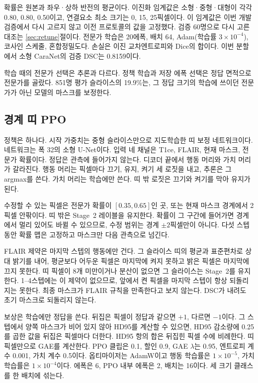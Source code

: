 \documentclass[runningheads]{llncs}
\begin{document}
확률은 원본과 좌우·상하 반전의 평균이다. 이진화 임계값은 소형·중형·대형이 각각 0.80, 0.80, 0.50이고, 연결요소 최소 크기는 0, 15, 25픽셀이다. 이 임계값은 이번 개발 검증에서 다시 고르지 않고 이전 프로토콜의 값을 고정했다. 검증 60명으로 다시 고른 대조는 \ref{sec:retune}절이다. 전문가 학습은 20에폭, 배치 64, Adam(학습률 $3\times10^{-4}$), 코사인 스케줄, 혼합정밀도다. 손실은 이진 교차엔트로피와 Dice의 합이다. 이번 분할에서 소형 CaraNet의 검증 DSC는 0.8159이다.

학습 때의 전문가 선택은 추론과 다르다. 정책 학습과 저장 에폭 선택은 정답 면적으로 전문가를 골랐다. 851명 평가 슬라이스의 19.9\%는, 그 정답 크기의 학습에 쓰이던 전문가가 아닌 모델의 마스크를 보정한다.

\subsection{경계 띠 PPO}
정책은 하나다. 시작 가중치는 중형 슬라이스만으로 지도학습한 띠 보정 네트워크이다. 네트워크는 폭 32의 소형 U-Net이다. 입력 네 채널은 T1ce, FLAIR, 현재 마스크, 전문가 확률이다. 정답은 관측에 들어가지 않는다. 디코더 끝에서 행동 머리와 가치 머리가 갈라진다. 행동 머리는 픽셀마다 끄기, 유지, 켜기 세 로짓을 내고, 추론은 그 argmax를 쓴다. 가치 머리는 학습에만 쓴다. 띠 밖 로짓은 끄기와 켜기를 막아 유지가 된다.

수정할 수 있는 픽셀은 전문가 확률이 $[0.35,0.65]$인 곳, 또는 현재 마스크 경계에서 2픽셀 안팎이다. 띠 밖은 Stage~2 레이블을 유지한다. 확률이 그 구간에 들어가면 경계에서 멀리 있어도 바뀔 수 있으므로, 수정 범위는 경계 $\pm2$픽셀만이 아니다. 다섯 스텝 동안 확률 맵은 고정하고 마스크만 다음 관측으로 넘긴다.

FLAIR 제약은 마지막 스텝의 행동에만 건다. 그 슬라이스 띠의 평균과 표준편차로 상대 밝기를 내어, 평균보다 어두운 픽셀은 마지막에 켜지 못하고 밝은 픽셀은 마지막에 끄지 못한다. 띠 픽셀이 8개 미만이거나 분산이 없으면 그 슬라이스는 Stage~2를 유지한다. 1--4스텝에는 이 제약이 없으므로, 앞에서 켠 픽셀을 마지막 스텝이 항상 되돌리지는 못한다. 최종 마스크가 FLAIR 규칙을 만족한다고 보지 않는다. DSC가 내려도 초기 마스크로 되돌리지 않는다.

보상은 학습에만 정답을 쓴다. 뒤집은 픽셀이 정답과 같으면 $+1$, 다르면 $-1$이다. 그 스텝에서 양쪽 마스크가 비어 있지 않아 HD95를 계산할 수 있으면, HD95 감소량에 0.25를 곱한 값을 뒤집은 픽셀마다 더한다. HD95 항의 합은 뒤집힌 픽셀 수에 비례한다. 띠 픽셀만으로 GAE를 계산한다. PPO 클립은 0.1, 할인 0.9, GAE $\lambda$는 0.95, 엔트로피 계수 0.001, 가치 계수 0.5이다. 옵티마이저는 AdamW이고 행동 학습률은 $1\times10^{-5}$, 가치 학습률은 $1\times10^{-4}$이다. 에폭은 6, PPO 내부 에폭은 2, 배치는 16이다. 세 크기 클래스를 한 배치에 섞는다.
\end{document}
